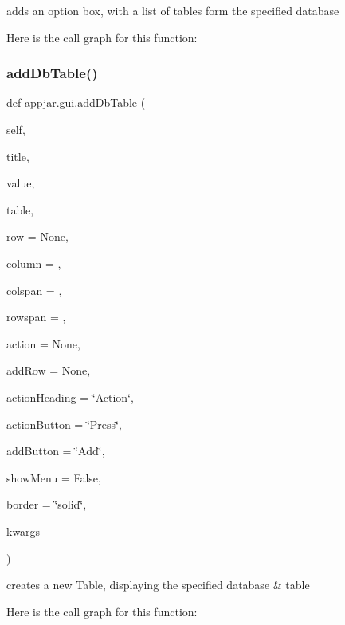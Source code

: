 \begin{DoxyVerb}adds an option box, with a list of tables form the specified database \end{DoxyVerb}
 Here is the call graph for this function\+:
\mbox{\label{classappjar_1_1gui_ae6fe0ecc7adf9eaf1c0d205d30b94e05}} 
\subsubsection{\texorpdfstring{add\+Db\+Table()}{addDbTable()}}
{\footnotesize\ttfamily def appjar.\+gui.\+add\+Db\+Table (\begin{DoxyParamCaption}\item[{}]{self,  }\item[{}]{title,  }\item[{}]{value,  }\item[{}]{table,  }\item[{}]{row = {\ttfamily None},  }\item[{}]{column = {},  }\item[{}]{colspan = {},  }\item[{}]{rowspan = {},  }\item[{}]{action = {\ttfamily None},  }\item[{}]{add\+Row = {\ttfamily None},  }\item[{}]{action\+Heading = {\ttfamily \char`\"{}Action\char`\"{}},  }\item[{}]{action\+Button = {\ttfamily \char`\"{}Press\char`\"{}},  }\item[{}]{add\+Button = {\ttfamily \char`\"{}Add\char`\"{}},  }\item[{}]{show\+Menu = {\ttfamily False},  }\item[{}]{border = {\ttfamily \char`\"{}solid\char`\"{}},  }\item[{}]{kwargs }\end{DoxyParamCaption})}

\begin{DoxyVerb}creates a new Table, displaying the specified database & table \end{DoxyVerb}
 Here is the call graph for this function\+:
\mbox{\label{classappjar_1_1gui_a922c9762b3770888073f2b7a559de77e}} 
